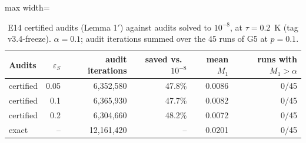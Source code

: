 \begin{table}[t]\centering\small
\begin{adjustbox}{max width=\linewidth}\begin{tabular}{lrrrrr}
\hline
Audits & $\varepsilon_S$ & audit iterations & saved vs.\ $10^{-8}$ & mean $M_1$ & runs with $M_1>\alpha$ \\
\hline
certified & 0.05 & 6{,}352{,}580 & 47.8\% & 0.0086 & 0/45 \\
certified & 0.1 & 6{,}365{,}930 & 47.7\% & 0.0082 & 0/45 \\
certified & 0.2 & 6{,}304{,}660 & 48.2\% & 0.0072 & 0/45 \\
exact & -- & 12{,}161{,}420 & -- & 0.0201 & 0/45 \\
\hline
\end{tabular}\end{adjustbox}
\caption{E14 certified audits (Lemma 1$'$) against audits solved to $10^{-8}$, at $\tau = 0.2$~K (tag v3.4-freeze). $\alpha = 0.1$; audit iterations summed over the 45 runs of G5 at $p = 0.1$.}
\label{tab:e14-tau02}
\end{table}
